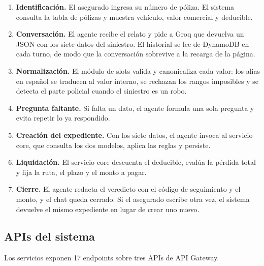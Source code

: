 \documentclass[12pt,letterpaper]{article}
\begin{document}
\begin{enumerate}[itemsep=3pt]
  \item \textbf{Identificación.} El asegurado ingresa su número de póliza. El sistema
        consulta la tabla de pólizas y muestra vehículo, valor comercial y deducible.
  \item \textbf{Conversación.} El agente recibe el relato y pide a Groq que devuelva un
        JSON con los siete datos del siniestro. El historial se lee de DynamoDB en cada
        turno, de modo que la conversación sobrevive a la recarga de la página.
  \item \textbf{Normalización.} El módulo de slots valida y canonicaliza cada valor: los
        alias en español se traducen al valor interno, se rechazan los rangos imposibles
        y se detecta el parte policial cuando el siniestro es un robo.
  \item \textbf{Pregunta faltante.} Si falta un dato, el agente formula una sola pregunta
        y evita repetir lo ya respondido.
  \item \textbf{Creación del expediente.} Con los siete datos, el agente invoca al
        servicio core, que consulta los dos modelos, aplica las reglas y persiste.
  \item \textbf{Liquidación.} El servicio core descuenta el deducible, evalúa la pérdida
        total y fija la ruta, el plazo y el monto a pagar.
  \item \textbf{Cierre.} El agente redacta el veredicto con el código de seguimiento y el
        monto, y el chat queda cerrado. Si el asegurado escribe otra vez, el sistema
        devuelve el mismo expediente en lugar de crear uno nuevo.
\end{enumerate}

\subsection{APIs del sistema}

Los servicios exponen 17 endpoints sobre tres APIs de API Gateway.
\end{document}
